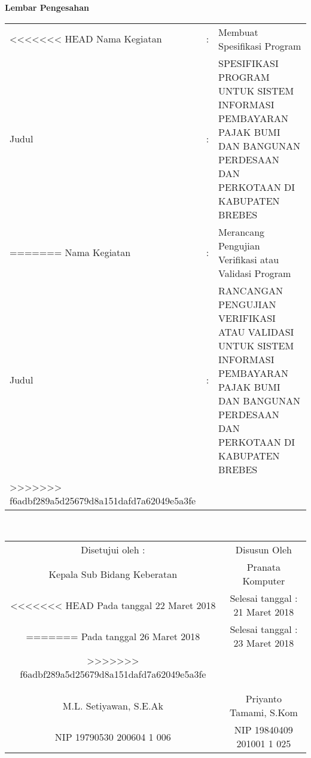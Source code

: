 \begin{center}
{\huge \bfseries Lembar Pengesahan}\\[0.4cm]

\begin{tabular}{l c p{10cm}}
<<<<<<< HEAD
  Nama Kegiatan & : & Membuat Spesifikasi Program \\
  Judul & : & SPESIFIKASI PROGRAM UNTUK SISTEM INFORMASI PEMBAYARAN PAJAK BUMI DAN BANGUNAN PERDESAAN DAN PERKOTAAN DI KABUPATEN BREBES \\
=======
  Nama Kegiatan & : & Merancang Pengujian Verifikasi atau Validasi Program \\
  Judul & : & RANCANGAN PENGUJIAN VERIFIKASI ATAU VALIDASI UNTUK SISTEM INFORMASI PEMBAYARAN PAJAK BUMI DAN BANGUNAN PERDESAAN DAN PERKOTAAN DI KABUPATEN BREBES \\
>>>>>>> f6adbf289a5d25679d8a151dafd7a62049e5a3fe
\end{tabular}\\[2cm]

\begin{tabular}{c c}
  Disetujui oleh : & Disusun Oleh \\
  Kepala Sub Bidang Keberatan & Pranata Komputer \\
<<<<<<< HEAD
  Pada tanggal 22 Maret 2018 & Selesai tanggal : 21 Maret 2018 \\
=======
  Pada tanggal 26 Maret 2018 & Selesai tanggal : 23 Maret 2018 \\
>>>>>>> f6adbf289a5d25679d8a151dafd7a62049e5a3fe
  & \\
  & \\
  & \\
  M.L. Setiyawan, S.E.Ak & Priyanto Tamami, S.Kom \\
  NIP 19790530 200604 1 006 & NIP 19840409 201001 1 025
\end{tabular}

\end{center}